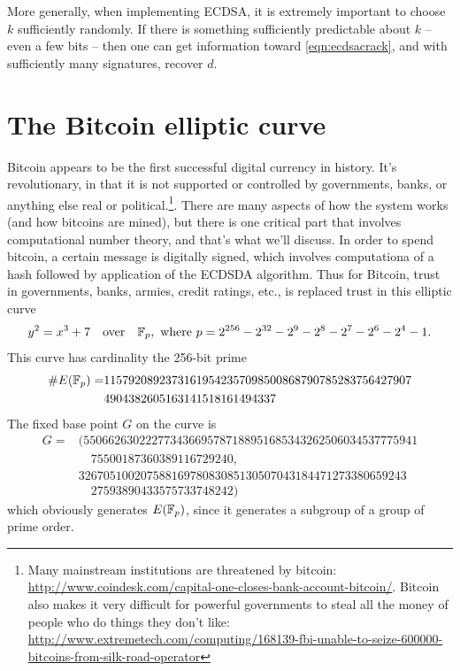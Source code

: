 \documentclass{book}
\begin{document}
More generally, when implementing ECDSA, it is extremely important to
choose $k$ sufficiently randomly.  If there is something sufficiently
predictable about $k$ -- even a few bits -- then one
can get information toward \eqref{eqn:ecdsacrack}, and with sufficiently
many signatures, recover $d$.


\section{The Bitcoin elliptic curve}




Bitcoin appears to be the first successful digital currency in history. It's
revolutionary, in that it is not supported or controlled by governments,
banks, or anything else real or political.\footnote{Many mainstream
institutions are threatened by bitcoin:\\ \url{http://www.coindesk.com/capital-one-closes-bank-account-bitcoin/}.  Bitcoin also makes it very difficult for powerful
governments to steal all the money of people who do things they don't like:  \url{http://www.extremetech.com/computing/168139-fbi-unable-to-seize-600000-bitcoins-from-silk-road-operator}}.
There are many aspects of how the
system works (and how bitcoins are mined), but there is one critical part that
involves computational number theory, and that's what we'll discuss.
In order to spend bitcoin, a certain message is digitally signed,
which involves computationa of a hash followed by application of the
ECDSDA algorithm.  Thus for Bitcoin, trust in governments, banks, armies,
credit ratings, etc., is replaced trust in this elliptic curve
$$
y^2 = x^3 + 7\quad\text{over}\quad \mathbb{F}_p,\,\,\text{where}\,\,
p=2^{256} - 2^{32} - 2^9 - 2^8 - 2^7 - 2^6 - 2^4 - 1.
$$
This curve has cardinality the 256-bit prime
\begin{align*}
\#E(\mathbb{F}_p) =& 11579208923731619542357098500868790785283756427907\\
& 4904382605163141518161494337
\end{align*}
The fixed base point $G$ on the curve is
\begin{align*}
G =& (550662630222773436695787188951685343262506034537775941\\
     & \quad 75500187360389116729240, \\
     & 32670510020758816978083085130507043184471273380659243\\
     & \quad 27593890433575733748242)
\end{align*}
which obviously generates $E(\mathbb{F}_p)$, since it generates a subgroup
of a group of prime order.
\end{document}
